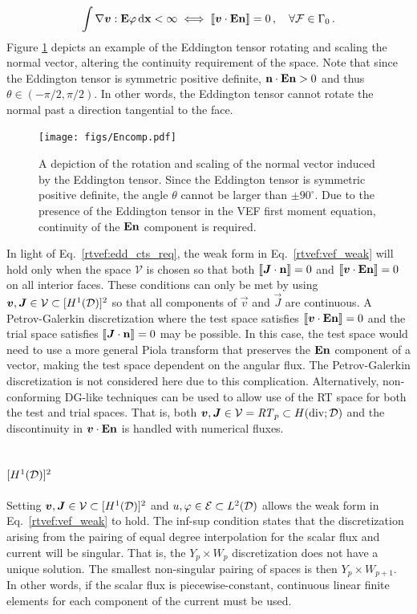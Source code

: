 \documentclass[../doc.tex]{subfiles}
\begin{document}
	\begin{equation} \label{rtvef:edd_cts_req}
		\int \nabla\boldsymbol{v} : \boldsymbol{\mathrm{E}}\varphi \mathop{}\!\mathrm{d} \boldsymbol{\mathrm{x}} < \infty \iff \left\llbracket\boldsymbol{v}\cdot\boldsymbol{\mathrm{E}}\boldsymbol{\mathrm{n}} \right\rrbracket = 0 \,, \quad \forall \mathcal{F} \in \Gamma_0 \,. 
	\end{equation}
Figure \ref{fig:Encomp} depicts an example of the Eddington tensor rotating and scaling the normal vector, altering the continuity requirement of the space. Note that since the Eddington tensor is symmetric positive definite, $\boldsymbol{\mathrm{n}}\cdot\boldsymbol{\mathrm{E}}\boldsymbol{\mathrm{n}} > 0$ and thus $\theta \in (-\pi/2,\pi/2)$. In other words, the Eddington tensor cannot rotate the normal past a direction tangential to the face. 
\begin{figure}
\centering
\texttt{[image: figs/Encomp.pdf]}
\caption{A depiction of the rotation and scaling of the normal vector induced by the Eddington tensor. Since the Eddington tensor is symmetric positive definite, the angle $\theta$ cannot be larger than $\pm 90^\circ$. Due to the presence of the Eddington tensor in the VEF first moment equation, continuity of the $\boldsymbol{\mathrm{E}}\boldsymbol{\mathrm{n}}$ component is required. }
\label{fig:Encomp}
\end{figure}

In light of Eq.~\ref{rtvef:edd_cts_req}, the weak form in Eq.~\ref{rtvef:vef_weak} will hold only when the space $\mathcal{V}$ is chosen so that both $\left\llbracket\boldsymbol{J}\cdot\boldsymbol{\mathrm{n}} \right\rrbracket = 0$ and $\left\llbracket\boldsymbol{v}\cdot\boldsymbol{\mathrm{E}}\boldsymbol{\mathrm{n}} \right\rrbracket = 0$ on all interior faces. These conditions can only be met by using $\boldsymbol{v}, \boldsymbol{J} \in \mathcal{V} \subset [H^1(\mathcal{D})]^2$ so that all components of $\vec{v}$ and $\vec{J}$ are continuous. A Petrov-Galerkin discretization where the test space satisfies $\left\llbracket\boldsymbol{v}\cdot\boldsymbol{\mathrm{E}}\boldsymbol{\mathrm{n}} \right\rrbracket = 0$ and the trial space satisfies $\left\llbracket\boldsymbol{J}\cdot\boldsymbol{\mathrm{n}} \right\rrbracket = 0$ may be possible. In this case, the test space would need to use a more general Piola transform that preserves the $\boldsymbol{\mathrm{E}}\boldsymbol{\mathrm{n}}$ component of a vector, making the test space dependent on the angular flux. The Petrov-Galerkin discretization is not considered here due to this complication. 
Alternatively, non-conforming DG-like techniques can be used to allow use of the RT space for both the test and trial spaces. That is, both $\boldsymbol{v}, \boldsymbol{J} \in \mathcal{V}=\mathit{RT}_p \subset H(\operatorname{div};\mathcal{D})$ and the discontinuity in $\boldsymbol{v}\cdot\boldsymbol{\mathrm{E}}\boldsymbol{\mathrm{n}}$ is handled with numerical fluxes. 

\subsection{$[H^1(\mathcal{D})]^2$}
Setting $\boldsymbol{v},\boldsymbol{J} \in \mathcal{V} \subset [H^1(\mathcal{D})]^2$ and $u,\varphi \in \mathcal{E} \subset L^2(\mathcal{D})$ allows the weak form in Eq.~\ref{rtvef:vef_weak} to hold. The inf-sup \cite{mfem_brezzi,Brezzi2003StabilityOS} condition states that the discretization arising from the pairing of equal degree interpolation for the scalar flux and current will be singular. That is, the $Y_p\times W_p$ discretization does not have a unique solution. The smallest non-singular pairing of spaces is then $Y_p \times W_{p+1}$. In other words, if the scalar flux is piecewise-constant, continuous linear finite elements for each component of the current must be used. 
\end{document}
